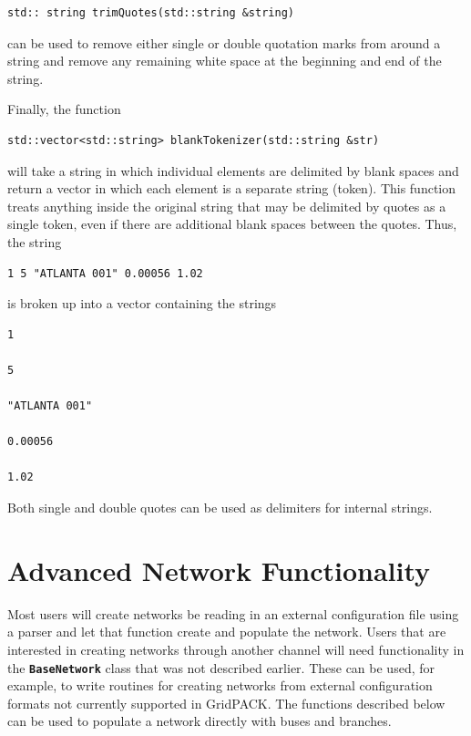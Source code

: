 \documentclass[12pt]{report} %
\begin{document}
{
\color{red}
\begin{Verbatim}[fontseries=b]
std:: string trimQuotes(std::string &string)
\end{Verbatim}
}

can be used to remove either single or double quotation marks from around a string and remove any remaining white space at the beginning and end of the string.

Finally, the function

{
\color{red}
\begin{Verbatim}[fontseries=b]
std::vector<std::string> blankTokenizer(std::string &str)
\end{Verbatim}
}

will take a string in which individual elements are delimited by blank spaces and return a vector in which each element is a separate string (token). This function treats anything inside the original string that may be delimited by quotes as a single token, even if there are additional blank spaces between the quotes. Thus, the string

{
\color{red}
\begin{Verbatim}[fontseries=b]
1 5 "ATLANTA 001" 0.00056 1.02
\end{Verbatim}
}

is broken up into a vector containing the strings


{
\color{red}
\begin{Verbatim}[fontseries=b]
1

5

"ATLANTA 001"

0.00056

1.02
\end{Verbatim}
}

Both single and double quotes can be used as delimiters for internal strings.

\section{Advanced Network Functionality}

Most users will create networks be reading in an external configuration file using a parser and let that function create and populate the network. Users that are interested in creating networks through another channel will need functionality in the \texttt{\textbf{BaseNetwork}} class that was not described earlier. These can be used, for example, to write routines for creating networks from external configuration formats not currently supported in GridPACK. The functions described below can be used to populate a network directly with buses and branches.
\end{document}
